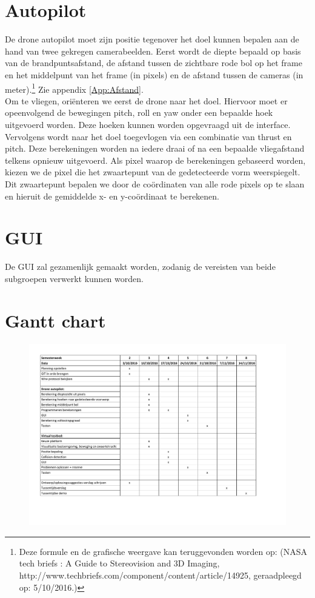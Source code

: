 \documentclass{peno-opdracht1}
\begin{document}
\section{Autopilot}
De drone autopilot moet zijn positie tegenover het doel kunnen bepalen aan de hand van twee gekregen camerabeelden. Eerst wordt de diepte bepaald op basis van de brandpuntsafstand, de afstand tussen de zichtbare rode bol op het frame en het middelpunt van het frame (in pixels) en de afstand tussen de camera\textquotesingle s (in meter).\footnote{Deze formule en de grafische weergave kan teruggevonden worden op: (NASA tech briefs : A Guide to Stereovision and 3D Imaging, http://www.techbriefs.com/component/content/article/14925, geraadpleegd op: 5/10/2016.)\label{refnote}} Zie appendix \ref{App:Afstand}. \\
Om te vliegen, ori\"enteren we eerst de drone naar het doel. Hiervoor moet er opeenvolgend de bewegingen pitch, roll en yaw onder een bepaalde hoek uitgevoerd worden. Deze hoeken kunnen worden opgevraagd uit de interface. Vervolgens wordt naar het doel toegevlogen via een combinatie van thrust en pitch.
Deze berekeningen worden na iedere draai of na een bepaalde vliegafstand telkens opnieuw uitgevoerd.
Als pixel waarop de berekeningen gebaseerd worden, kiezen we de pixel die het zwaartepunt van de gedetecteerde vorm weerspiegelt. Dit zwaartepunt bepalen we door de coördinaten van alle rode pixels op te slaan en hieruit de gemiddelde x- en y-co\"ordinaat te berekenen.

\section{GUI}
De GUI zal gezamenlijk gemaakt worden, zodanig de vereisten van beide subgroepen verwerkt kunnen worden. \\

\newpage
\appendix
\section{Gantt chart} \label{App:Planning}

\begin{figure}[h!]
	\begin{center}
		\includegraphics[scale=0.55]{Planning.pdf}
	\end{center}
\end{figure}
\end{document}
